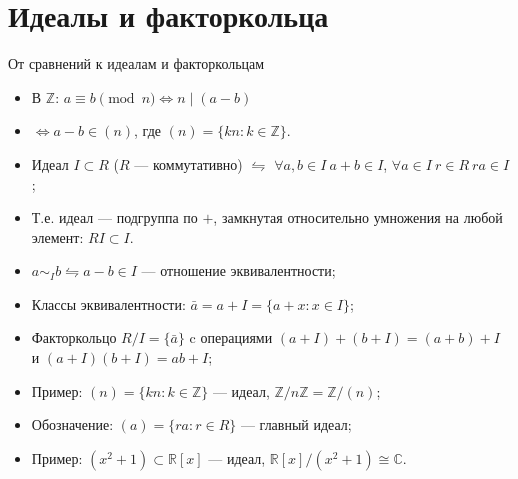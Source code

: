 \documentclass[serif, aspectratio=169]{beamer}
\begin{document}
\section{Идеалы и факторкольца}

\begin{frame}{От сравнений к идеалам и факторкольцам}
    \begin{itemize}
        \item В $\mathbb{Z}$: $a\equiv b\pmod{n} \Leftrightarrow n\mid(a-b)$
        \item $\Leftrightarrow a-b\in(n)$, где $(n)=\{kn : k\in\mathbb{Z}\}$.
        \item Идеал $I\subset R$ ($R$ --- коммутативно) $\leftrightharpoons$ $\forall a,b\in I\ a+b\in I$, $\forall a\in I\ r\in R\ ra\in I$;
        \item Т.е. идеал --- подгруппа по $+$, замкнутая относительно умножения на любой элемент: $RI\subset I$.
        \item $a\sim_I b \leftrightharpoons a-b\in I$ --- отношение эквивалентности;
        \item Классы эквивалентности: $\bar a=a+I=\{a+x : x\in I\}$;
        \item Факторкольцо $R/I = \{\bar a\}$ c операциями $(a+I)+(b+I)=(a+b)+I$ и $(a+I)(b+I)=ab+I$;
        \item Пример: $(n)=\{kn : k\in\mathbb{Z}\}$ --- идеал, $\mathbb{Z}/n\mathbb{Z}=\mathbb{Z}/(n)$;
        \item Обозначение: $(a)=\{ra : r\in R\}$ --- главный идеал;
        \item Пример: $(x^2+1)\subset\mathbb{R}[x]$ --- идеал, $\mathbb{R}[x]/(x^2+1)\cong\mathbb{C}$.
    \end{itemize}
\end{frame}
\end{document}
